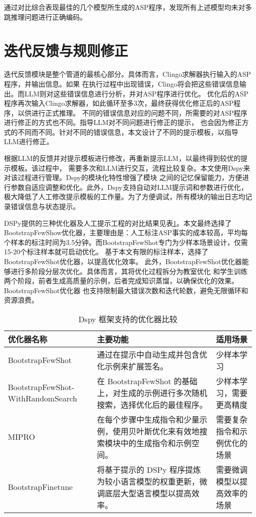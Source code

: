 通过对比综合表现最佳的几个模型所生成的ASP程序，发现所有上述模型均未对多跳推理问题进行正确编码。


\section{迭代反馈与规则修正}
迭代反馈模块是整个管道的最核心部分。具体而言，Clingo求解器执行输入的ASP程序，并输出信息。如果
在执行过程中出现错误，Clingo将会把这些错误信息输出。而LLM则对这些错误信息进行分析，并对ASP程序进行优化。
优化后的ASP程序再次输入Clingo求解器，如此循环至多3次，最终获得优化修正后的ASP程序，以供进行正式推理。
不同的错误信息对应的问题不同，所需要的对ASP程序进行修正的方式也不同。指导LLM对不同问题进行修正的提示，
也会因为修正方式的不同而不同。针对不同的错误信息，本文设计了不同的提示模板，以指导LLM进行修正。

根据LLM的反馈并对提示模板进行修改，再重新提示LLM，以最终得到较优的提示模板。该过程中，
需要多次和LLM进行交互，流程比较复杂。本文使用Dspy来对该过程进行管理。Dspy的模块化特性增强了模块
之间的记忆保留能力，方便进行参数自适应调整和优化。此外，Dspy支持自动对LLM提示词和参数进行优化，
极大降低了人工修改提示模板的工作量。为了方便调试，所有模块的输出日志均记录错误信息与状态提示。

DSPy提供的三种优化器及人工提示工程的对比结果见表\ref{tab:optimizer_comparison}。本文最终选择了BootstrapFewShow优化器，主要理由是：人工标注ASP事实的成本较高，平均每个样本的标注时间为3.5分钟。而BootstrapFewShot专门为少样本场景设计，仅需15-20个标注样本就可启动优化。
基于本文有限的标注样本，选择了BootstrapFewShot优化器，以提高优化效率。
此外，BootstrapFewShot优化器能够进行多阶段分层次优化。具体而言，其将优化过程拆分为教室优化
和学生训练两个阶段，前者生成高质量的示例，后者完成知识蒸馏，以确保优化的效果。BootstrapFewShot优化器
也支持限制最大错误次数和迭代轮数，避免无限循环和资源浪费。

\begin{table}[htbp]
\centering
\caption{Dspy 框架支持的优化器比较}
\label{tab:optimizer_comparison}
\begin{tabular}{|>{\raggedright}p{4cm}|>{\raggedright}p{8cm}|>{\raggedright\arraybackslash}p{4cm}|}
\hline
\textbf{优化器名称} & \textbf{主要功能} & \textbf{适用场景} \\
\hline
BootstrapFewShot & 通过在提示中自动生成并包含优化示例来扩展签名。 & 少样本学习 \\
\hline
BootstrapFewShot-
WithRandomSearch & 在 BootstrapFewShot 的基础上，对生成的示例进行多次随机搜索，选择优化后的最佳程序。 & 少样本学习，需要更高精度 \\
\hline
MIPRO & 在每个步骤中生成指令和少量示例，使用贝叶斯优化来有效地搜索模块中的生成指令和示例空间。 & 需要复杂指令和示例优化的场景 \\
\hline
BootstrapFinetune & 将基于提示的 DSPy 程序提炼为较小语言模型的权重更新，微调底层大型语言模型以提高效率。 & 需要微调模型以提高效率的场景 \\
\hline
\end{tabular}
\end{table}

